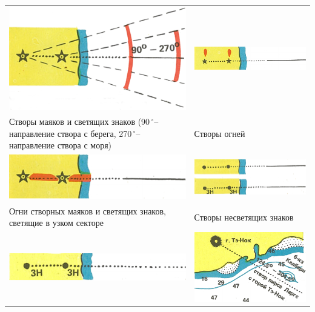 \documentclass[a4paper, 12pt, twoside, final, book, russian, fittopage, cyremdash]{ncc}
\newcommand{\gr}{\ensuremath{\,^\circ}\xspace}
\begin{document}
\small
\begin{longtable}{m{}|m{}}
  \toprule
  \includegraphics[scale=1.3]{APP-2-B-25} & \includegraphics[scale=1.3]{APP-2-B-27} \\
  Створы маяков и светящих знаков (90\gr \--- направление створа с берега, 270\gr \--- направление створа с моря) & Створы огней \\
  \midrule
  \includegraphics[scale=1.3]{APP-2-B-26} & \includegraphics[scale=1.3]{APP-2-B-28} \\
  Огни створных маяков и светящих знаков, светящие в узком секторе & Створы несветящих знаков \\
  \midrule
  \includegraphics[scale=1.3]{APP-2-B-29} & \includegraphics[scale=1.3]{APP-2-B-32} \\

\end{longtable}
\end{document}
